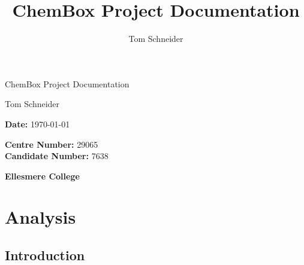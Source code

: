 \documentclass[a4paper,12pt]{article}
\title{ChemBox Project Documentation}
\author{Tom Schneider}
\begin{document}
\begin{titlepage}
    \begin{center}
        \vspace*{1cm}
        
        \huge ChemBox Project Documentation
        
        \vspace{1cm}
        
        \Large Tom Schneider
        
        \vfill
        
        \textbf{Date:} \today \\
        
        \vspace{1cm}
        
        \textbf{Centre Number:} 29065 \\
        \textbf{Candidate Number:} 7638 \\
        
        \vspace{1cm}
        
        \textbf{Ellesmere College}
        
    \end{center}
\end{titlepage}

\tableofcontents

\pagebreak

\section{Analysis}

\subsection{Introduction}
\end{document}

